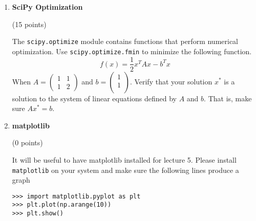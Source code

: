 \documentclass{article}
\newcounter{points}
\newcommand\setpoints[1]{\addtocounter{points}{#1}(#1 points)}
\newcommand\printpoints{Total number of points: \value{\thepoints}}
\begin{document}
\begin{enumerate}
\item \textbf{SciPy Optimization} \setpoints{15}

The \texttt{scipy.optimize} module contains functions that perform numerical optimization. Use \newline
\texttt{scipy.optimize.fmin} to minimize the following function. 
$$f(x) = \frac{1}{2}x^TAx - b^Tx$$
When 
$A= \begin{pmatrix}
1 & 1\\
1 & 2
\end{pmatrix}$
and $b = \begin{pmatrix}
1 \\
1 \\
\end{pmatrix}$.
Verify that your solution $x^*$ is a solution to the system of linear equations defined by $A$ and $b$. That is, make sure $Ax^*=b$.

\item \textbf{matplotlib} \setpoints{0}

It will be useful to have matplotlib installed for lecture 5. Please install \texttt{matplotlib} on your system and make sure the following lines produce a graph 
\begin{verbatim}
>>> import matplotlib.pyplot as plt
>>> plt.plot(np.arange(10))
>>> plt.show()
\end{verbatim}
\end{enumerate}
\end{document}
